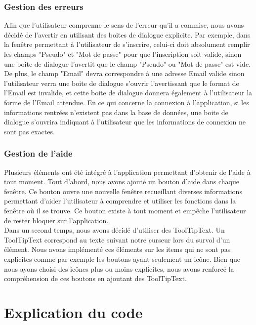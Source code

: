 \documentclass[11pt]{article}
\begin{document}
\subsubsection{Gestion des erreurs}
Afin que l'utilisateur comprenne le sens de l'erreur qu'il a commise, nous avons décidé de l'avertir en utilisant des boites de dialogue explicite. Par exemple, dans la fenêtre permettant à l'utilisateur de s'inscrire, celui-ci doit absolument remplir les champs "Pseudo" et "Mot de passe" pour que l'inscription soit valide, sinon une boite de dialogue l'avertit que le champ "Pseudo" ou "Mot de passe" est vide. De plus, le champ "Email" devra correspondre à une adresse Email valide sinon l'utilisateur verra une boite de dialogue s'ouvrir l'avertissant que le format de l'Email est invalide, et cette boite de dialogue donnera également à l'utilisateur la forme de l'Email attendue. En ce qui concerne la connexion à l'application, si les informations rentrées n'existent pas dans la base de données, une boite de dialogue s'ouvrira indiquant à l'utilisateur que les informations de connexion ne sont pas exactes.

\subsubsection{Gestion de l'aide}
Plusieurs éléments ont été intégré à l'application permettant d'obtenir de l'aide à tout moment. Tout d'abord, nous avons ajouté un bouton d'aide dans chaque fenêtre. Ce bouton ouvre une nouvelle fenêtre recueillant diverses informations permettant d'aider l'utilisateur à comprendre et utiliser les fonctions dans la fenêtre où il se trouve. Ce bouton existe à tout moment et empêche l'utilisateur de rester bloquer sur l'application.~\\
Dans un second temps, nous avons décidé d'utiliser des ToolTipText. Un ToolTipText correspond au texte suivant notre curseur lors du survol d'un élément. Nous avons implémenté ces éléments sur les items qui ne sont pas explicites comme par exemple les boutons ayant seulement un icône. Bien que nous ayons choisi des icônes plus ou moins explicites, nous avons renforcé la compréhension de ces boutons en ajoutant des ToolTipText.

\section{Explication du code}
\end{document}
